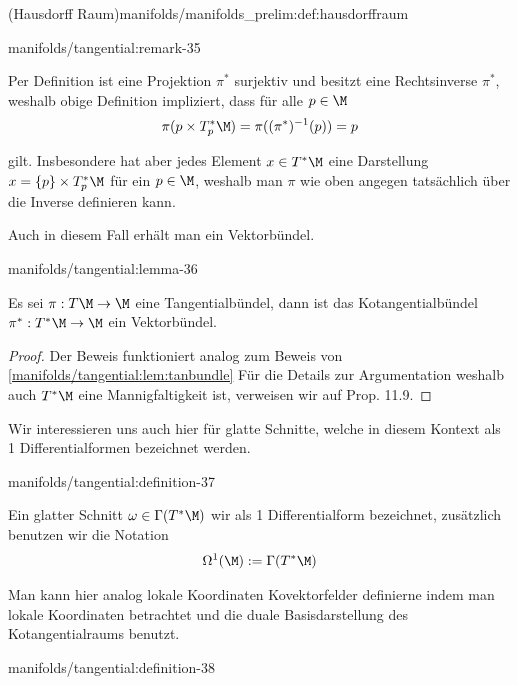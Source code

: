 \documentclass[letterpaper,10pt,english]{jupyterBook}
\begin{document}
\begin{definition}{(Hausdorff Raum)}{manifolds/manifolds_prelim:def:hausdorffraum}
\begin{remark}{}{manifolds/tangential:remark-35}
\par
Per Definition ist eine Projektion \(\pi^\ast\) surjektiv und besitzt eine Rechtsinverse \(\pi^\ast\), weshalb obige Definition impliziert, dass für alle \(p\in\M\)
\begin{align*}
\pi({p}\times T_p^\ast\M) = \pi((\pi^{\ast})^{-1}(p)) = p
\end{align*}
\par
gilt. Insbesondere hat aber jedes Element \(x\in T^\ast\M\) eine Darstellung \(x=\{p\}\times T_p^\ast\M\) für ein \(p\in\M\), weshalb man \(\pi\) wie oben angegen tatsächlich über die Inverse definieren kann.
\end{remark}

\par
Auch in diesem Fall erhält man ein Vektorbündel.
\begin{lemma}{}{manifolds/tangential:lemma-36}



\par
Es sei \(\pi:T\M\to\M\) eine Tangentialbündel, dann ist das Kotangentialbündel \(\pi^\ast:T^\ast\M\to\M\) ein Vektorbündel.
\end{lemma}

\begin{proof}
 Der Beweis funktioniert analog zum Beweis von \cref{manifolds/tangential:lem:tanbundle}  Für die Details zur Argumentation weshalb auch \(T^\ast\M\) eine Mannigfaltigkeit ist, verweisen wir auf \cite{Lee03} Prop. 11.9.
\end{proof}

\par
Wir interessieren uns auch hier für glatte Schnitte, welche in diesem Kontext als 1 Differentialformen bezeichnet werden.
\begin{definition}{}{manifolds/tangential:definition-37}



\par
Ein glatter Schnitt \(\omega\in\Gamma(T^\ast\M)\) wir als 1 Differentialform bezeichnet, zusätzlich benutzen wir die Notation
\begin{align*}
\Omega^1(\M) := \Gamma(T^\ast\M)
\end{align*}\end{definition}

\par
Man kann hier analog lokale Koordinaten Kovektorfelder definierne indem man lokale Koordinaten betrachtet und die duale Basisdarstellung des Kotangentialraums benutzt.
\begin{definition}{}{manifolds/tangential:definition-38}




\end{definition}
\end{definition}
\end{document}
